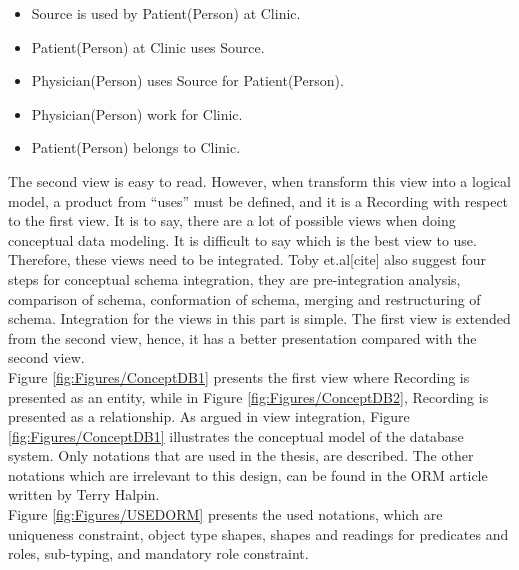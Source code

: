 \begin{itemize}
\item Source is used by Patient(Person) at Clinic.\\
\item Patient(Person) at Clinic uses Source.\\
\item Physician(Person) uses Source for Patient(Person).\\
\item Physician(Person) work for Clinic.\\
\item Patient(Person) belongs to Clinic.
\end{itemize}
The second view is easy to read. However, when transform this view into a logical model, a product from “uses” must be defined, and it is a Recording with respect to the first view. It is to say, there are a lot of possible views when doing conceptual data modeling. It is difficult to say which is the best view to use. Therefore, these views need to be integrated. Toby et.al[cite] also suggest four steps for conceptual schema integration, they are pre-integration analysis, comparison of schema, conformation of schema, merging and restructuring of schema. Integration for the views in this part is simple. The first view is extended from the second view, hence, it has a better presentation compared with the second view.\\
Figure \ref{fig:Figures/ConceptDB1} presents the first view where Recording is presented as an entity, while in Figure \ref{fig:Figures/ConceptDB2}, Recording is presented as a relationship. As argued in view integration, Figure \ref{fig:Figures/ConceptDB1} illustrates the conceptual model of the database system. Only notations that are used in the thesis, are described. The other notations which are irrelevant to this design, can be found in the ORM article written by Terry Halpin\citep{ORMdotNET2}.\\
Figure \ref{fig:Figures/USEDORM} presents the used notations, which are uniqueness constraint, object type shapes, shapes and readings for predicates and roles, sub-typing, and mandatory role constraint.\\
